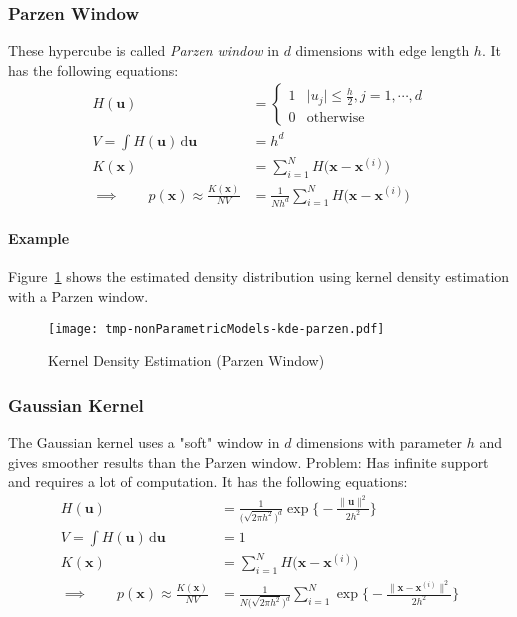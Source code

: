 \documentclass[a4paper, 11pt, accentcolor = tud3b]{tudreport}
\newcommand{\abs}[1]{\ensuremath{\lvert #1 \rvert}}
\newcommand{\dif}[1]{\ensuremath{\,\mathrm{d}#1}}
\renewcommand{\vec}[1]{\mathbf{#1}}
\begin{document}
				\subsubsection{Parzen Window}
					These hypercube is called \emph{Parzen window} in \(d\) dimensions with edge length \(h\). It has the following equations:
					\begin{align}
						H(\vec{u}) &=
							\begin{cases}
								1 & \abs{u_j} \leq \frac{h}{2}, j = 1, \cdots, d \\
								0 & \textrm{otherwise}
							\end{cases} \\
						V = \int H(\vec{u}) \dif{\vec{u}} &= h^d \\
						K(\vec{x}) &= \sum_{i = 1}^{N} H\big(\vec{x} - \vec{x}^{(i)}\big) \\
						\implies\qquad p(\vec{x}) \approx \frac{K(\vec{x})}{NV} &= \frac{1}{Nh^d} \sum_{i = 1}^{N} H\big(\vec{x} - \vec{x}^{(i)}\big)
					\end{align}

					\paragraph{Example}
						Figure~\ref{fig:kdeParzen} shows the estimated density distribution using kernel density estimation with a Parzen window.

						\begin{figure} 
							\centering
							\texttt{[image: tmp-nonParametricModels-kde-parzen.pdf]}
							\caption{Kernel Density Estimation (Parzen Window)}
							\label{fig:kdeParzen}
						\end{figure}

				\subsubsection{Gaussian Kernel}
					The Gaussian kernel uses a "soft" window in \(d\) dimensions with parameter \(h\) and gives smoother results than the Parzen window. Problem: Has infinite support and requires a lot of computation. It has the following equations:
					\begin{align}
						H(\vec{u}) &= \frac{1}{\big(\sqrt{2 \pi h^2}\big)^d} \exp\Bigg\{ -\frac{\lVert \vec{u} \rVert^2}{2h^2} \Bigg\} \\
						V = \int H(\vec{u}) \dif{\vec{u}} &= 1 \\
						K(\vec{x}) &= \sum_{i = 1}^{N} H\big(\vec{x} - \vec{x}^{(i)}\big) \\
						\implies\qquad p(\vec{x}) \approx \frac{K(\vec{x})}{NV} &= \frac{1}{N\big(\sqrt{2 \pi h^2}\big)^d} \sum_{i = 1}^{N} \exp\Bigg\{ -\frac{\lVert \vec{x} - \vec{x}^{(i)} \rVert^2}{2h^2} \Bigg\}
					\end{align}
\end{document}

